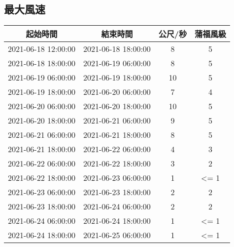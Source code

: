 \documentclass{article}%
\begin{document}
\begin{center}
\section{最大風速}%
\label{sec:}%
\begin{tabular}{|c|c|c|c|}%
\hline%
起始時間&結束時間&公尺/秒&蒲福風級\\%
\hline%
2021{-}06{-}18 12:00:00&2021{-}06{-}18 18:00:00&8&5\\%
\hline%
2021{-}06{-}18 18:00:00&2021{-}06{-}19 06:00:00&8&5\\%
\hline%
2021{-}06{-}19 06:00:00&2021{-}06{-}19 18:00:00&10&5\\%
\hline%
2021{-}06{-}19 18:00:00&2021{-}06{-}20 06:00:00&7&4\\%
\hline%
2021{-}06{-}20 06:00:00&2021{-}06{-}20 18:00:00&10&5\\%
\hline%
2021{-}06{-}20 18:00:00&2021{-}06{-}21 06:00:00&9&5\\%
\hline%
2021{-}06{-}21 06:00:00&2021{-}06{-}21 18:00:00&8&5\\%
\hline%
2021{-}06{-}21 18:00:00&2021{-}06{-}22 06:00:00&4&3\\%
\hline%
2021{-}06{-}22 06:00:00&2021{-}06{-}22 18:00:00&3&2\\%
\hline%
2021{-}06{-}22 18:00:00&2021{-}06{-}23 06:00:00&1&<= 1\\%
\hline%
2021{-}06{-}23 06:00:00&2021{-}06{-}23 18:00:00&2&2\\%
\hline%
2021{-}06{-}23 18:00:00&2021{-}06{-}24 06:00:00&2&2\\%
\hline%
2021{-}06{-}24 06:00:00&2021{-}06{-}24 18:00:00&1&<= 1\\%
\hline%
2021{-}06{-}24 18:00:00&2021{-}06{-}25 06:00:00&1&<= 1\\%
\hline%
\end{tabular}

%

\end{center}
\end{document}
